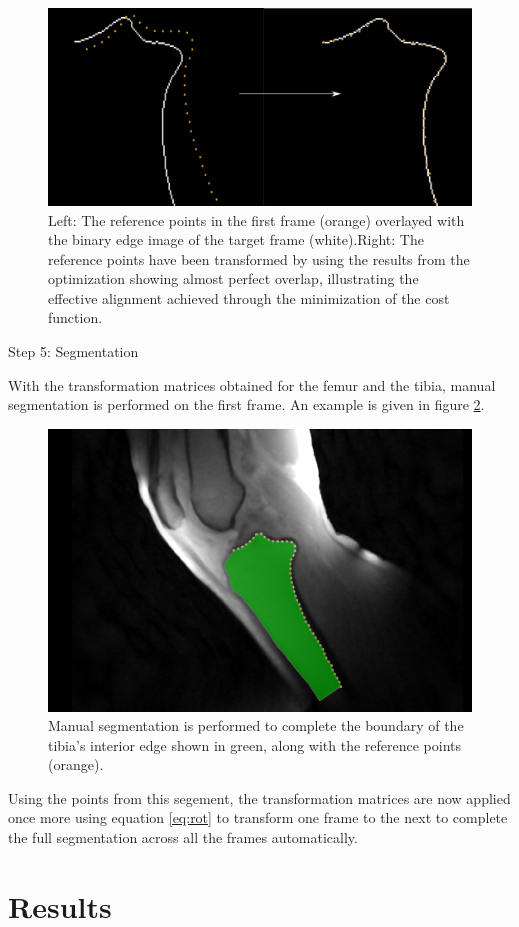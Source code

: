 \documentclass{micro-econ-thesis}
\begin{document}
\begin{figure}[H]
	\centering
	\includegraphics[width=0.7\linewidth]{image137}
	\caption{Left: The reference points in the first frame (orange) overlayed with the binary edge image of the target frame (white).Right: The reference points have been transformed by using the results from the optimization showing almost perfect overlap, illustrating the effective alignment achieved through the minimization of the cost function.}
	\label{fig:edge_tracking}
\end{figure}

Step 5: Segmentation 

With the transformation matrices obtained for the femur and the tibia, manual segmentation is performed on the first frame. An example is given in figure \ref{fig:manualsegment}. 
\begin{figure} [H]
	\centering
	\includegraphics[width=0.7\linewidth]{manual_segment}
	\caption{Manual segmentation is performed to complete the boundary of the tibia's interior edge shown in green, along with the reference points (orange).}
	\label{fig:manualsegment}
\end{figure}

Using the points from this segement, the transformation matrices are now applied once more using equation \ref{eq:rot} to transform one frame to the next to complete the full segmentation across all the frames automatically.   

\section{Results}
\label{sec:yetanother}
\end{document}
